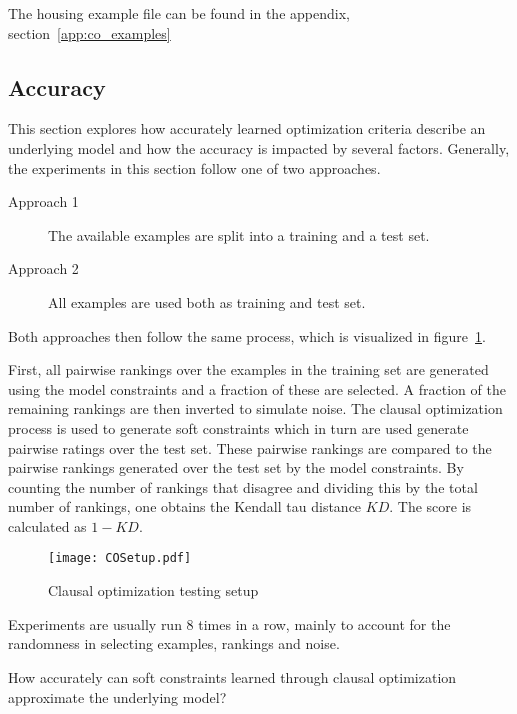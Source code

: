 The housing example file can be found in the appendix, section~\ref{app:co_examples}

\subsection{Accuracy}

This section explores how accurately learned optimization criteria describe an underlying model and how the accuracy is impacted by several factors.
Generally, the experiments in this section follow one of two approaches.
\begin{description}
	\item[Approach 1] The available examples are split into a training and a test set.
	\item[Approach 2] All examples are used both as training and test set.
\end{description}
Both approaches then follow the same process, which is visualized in figure~\ref{fig:co_test_setup}.

First, all pairwise rankings over the examples in the training set are generated using the model constraints and a fraction of these are selected.
A fraction of the remaining rankings are then inverted to simulate noise.
The clausal optimization process is used to generate soft constraints which in turn are used generate pairwise ratings over the test set.
These pairwise rankings are compared to the pairwise rankings generated over the test set by the model constraints.
By counting the number of rankings that disagree and dividing this by the total number of rankings, one obtains the Kendall tau distance $\mathit{KD}$.
The score is calculated as $1 - \mathit{KD}$.

\begin{figure}

	\caption{Clausal optimization testing setup}
	\centering
		\texttt{[image: COSetup.pdf]}
	\label{fig:co_test_setup}

\end{figure}

Experiments are usually run $8$ times in a row, mainly to account for the randomness in selecting examples, rankings and noise.

\begin{question}
	How accurately can soft constraints learned through clausal optimization approximate the underlying model?
\end{question}

